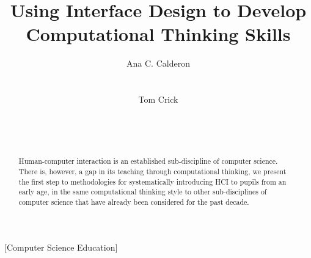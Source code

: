 \documentclass{sig-alternate}
\begin{document}
%

\title{Using Interface Design to Develop\\Computational Thinking Skills}


\author{
\alignauthor
Ana C. Calderon\\
\\
\\
\alignauthor
Tom Crick\\
\\
\\
\\
}

\maketitle

\begin{abstract}
Human-computer interaction is an established sub-discipline of
computer science. There is, however, a gap in its teaching through
computational thinking, we present the first step to methodologies for
systematically introducing HCI to pupils from an early age, in the
same computational thinking style to other sub-disciplines of computer
science that have already been considered for the past decade.
\end{abstract}

[Computer Science Education]
\end{document}
